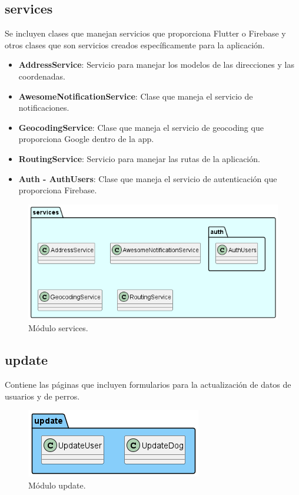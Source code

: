 \documentclass[a4paper, 12pt]{article}
\begin{document}
\subsection*{services}

Se incluyen clases que manejan servicios que proporciona Flutter o Firebase y otros clases que son servicios creados específicamente para la aplicación.

\begin{itemize}[noitemsep]
	\item \textbf{AddressService}: Servicio para manejar los modelos de las direcciones y las coordenadas.
	\item \textbf{AwesomeNotificationService}: Clase que maneja el servicio de notificaciones. 
	\item \textbf{GeocodingService}: Clase que maneja el servicio de geocoding que proporciona Google dentro de la app.
	\item \textbf{RoutingService}:  Servicio para manejar las rutas de la aplicación.
	\item \textbf{Auth - AuthUsers}:  Clase que maneja el servicio de autenticación que proporciona Firebase.
\end{itemize}



\begin{figure}[H]
	\begin{center}
		{\includegraphics[width=0.8\linewidth]{diagram/Services.png}\par}
		\caption{Módulo services.}
	\end{center}
\end{figure}

\subsection*{update}

Contiene las páginas que incluyen formularios para la actualización de datos de usuarios y de perros.

\begin{figure}[H]
	\begin{center}
		{\includegraphics[]{diagram/Update.png}\par}
		\caption{Módulo update.}
	\end{center}
\end{figure}
\end{document}
